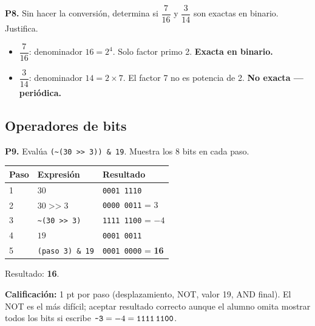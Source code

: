 \documentclass[12pt, oneside]{article}
\begin{document}
\medskip
\textbf{P8.} Sin hacer la conversión, determina si $\dfrac{7}{16}$ y
$\dfrac{3}{14}$ son exactas en binario.  Justifica.

\begin{notaprofesor}
  \begin{itemize}
    \item $\dfrac{7}{16}$: denominador $16 = 2^4$. Solo factor primo 2.
          \textbf{Exacta en binario.}
    \item $\dfrac{3}{14}$: denominador $14 = 2 \times 7$.
          El factor 7 no es potencia de 2.
          \textbf{No exacta — periódica.}
  \end{itemize}
\end{notaprofesor}

\subsection{Operadores de bits}

\textbf{P9.} Evalúa \texttt{(\textasciitilde(30 >> 3)) \& 19}.
Muestra los 8 bits en cada paso.

\begin{notaprofesor}
  \begin{center}
  \begin{tabular}{lll}
    \toprule
    Paso & Expresión & Resultado \\
    \midrule
    1 & $30$ & \texttt{0001 1110} \\
    2 & $30 \;\texttt{>>}\; 3$ & \texttt{0000 0011} = 3 \\
    3 & \texttt{\textasciitilde{}(30 >> 3)} & \texttt{1111 1100} = $-4$ \\
    4 & $19$ & \texttt{0001 0011} \\
    5 & \texttt{(paso 3) \& 19} & \texttt{0001 0000} = \textbf{16} \\
    \bottomrule
  \end{tabular}
  \end{center}
  Resultado: \textbf{16}.

  \textbf{Calificación:} 1 pt por paso (desplazamiento, NOT, valor 19, AND final).
  El NOT es el más difícil; aceptar resultado correcto aunque el alumno omita
  mostrar todos los bits si escribe $\texttt{\textasciitilde 3} = -4 = \texttt{1111\,1100}$.
\end{notaprofesor}
\end{document}
